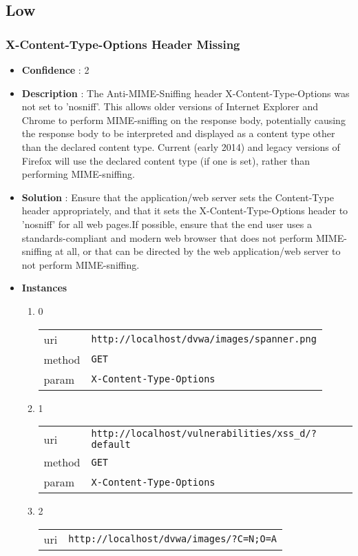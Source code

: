 \documentclass[10pt]{article}
\begin{document}
\subsection{Low}
\subsubsection{X-Content-Type-Options Header Missing}
\begin{itemize}
\item[] \textbf{Confidence} : 2
\item[] \textbf{Description} : The Anti-MIME-Sniffing header X-Content-Type-Options was not set to 'nosniff'. This allows older versions of Internet Explorer and Chrome to perform MIME-sniffing on the response body, potentially causing the response body to be interpreted and displayed as a content type other than the declared content type. Current (early 2014) and legacy versions of Firefox will use the declared content type (if one is set), rather than performing MIME-sniffing.
\item[] \textbf{Solution} :  Ensure that the application/web server sets the Content-Type header appropriately, and that it sets the X-Content-Type-Options header to 'nosniff' for all web pages.If possible, ensure that the end user uses a standards-compliant and modern web browser that does not perform MIME-sniffing at all, or that can be directed by the web application/web server to not perform MIME-sniffing.
\item[] \textbf{Instances}
\begin{enumerate}
\item[] 0
\begin{tabular}{| l | p{12cm}}
uri & \texttt{http://localhost/dvwa/images/spanner.png} \\
method & \texttt{GET} \\
param & \texttt{X-Content-Type-Options} \\
\end{tabular}
\item[] 1
\begin{tabular}{| l | p{12cm}}
uri & \texttt{http://localhost/vulnerabilities/xss\_d/?default} \\
method & \texttt{GET} \\
param & \texttt{X-Content-Type-Options} \\
\end{tabular}
\item[] 2
\begin{tabular}{| l | p{12cm}}
uri & \texttt{http://localhost/dvwa/images/?C=N;O=A} \\

\end{tabular}
\end{enumerate}
\end{itemize}
\end{document}
